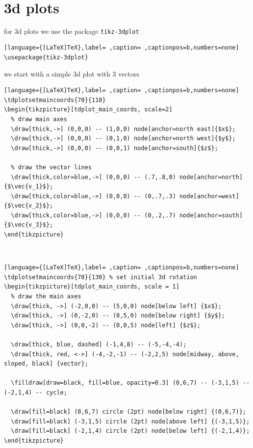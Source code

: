 \documentclass[a4paper,12pt]{article}
\begin{document}
\\[0pt]

\section{3d plots}
\label{sec:org336a9c7}
for 3d plots we use the package \texttt{tikz-3dplot}\\[0pt]
\begin{lstlisting}[language={[LaTeX]TeX},label= ,caption= ,captionpos=b,numbers=none]
\usepackage{tikz-3dplot}
\end{lstlisting}
we start with a simple 3d plot with 3 vectors\\[0pt]
\begin{lstlisting}[language={[LaTeX]TeX},label= ,caption= ,captionpos=b,numbers=none]
\tdplotsetmaincoords{70}{110}
\begin{tikzpicture}[tdplot_main_coords, scale=2]
  % draw main axes
  \draw[thick,->] (0,0,0) -- (1,0,0) node[anchor=north east]{$x$};
  \draw[thick,->] (0,0,0) -- (0,1,0) node[anchor=north west]{$y$};
  \draw[thick,->] (0,0,0) -- (0,0,1) node[anchor=south]{$z$};

  % draw the vector lines
  \draw[thick,color=blue,->] (0,0,0) -- (.7,.8,0) node[anchor=north]{$\vec{v_1}$};
  \draw[thick,color=blue,->] (0,0,0) -- (0,.7,.3) node[anchor=west]{$\vec{v_2}$};
  \draw[thick,color=blue,->] (0,0,0) -- (0,.2,.7) node[anchor=south]{$\vec{v_3}$};
\end{tikzpicture}
\end{lstlisting}

\\[0pt]

\begin{lstlisting}[language={[LaTeX]TeX},label= ,caption= ,captionpos=b,numbers=none]
\tdplotsetmaincoords{70}{130} % set initial 3d rotation
\begin{tikzpicture}[tdplot_main_coords, scale = 1]
  % draw the main axes
  \draw[thick, ->] (-2,0,0) -- (5,0,0) node[below left] {$x$};
  \draw[thick, ->] (0,-2,0) -- (0,5,0) node[below right] {$y$};
  \draw[thick, ->] (0,0,-2) -- (0,0,5) node[left] {$z$};

  \draw[thick, blue, dashed] (-1,4,8) -- (-5,-4,-4);
  \draw[thick, red, <->] (-4,-2,-1) -- (-2,2,5) node[midway, above, sloped, black] {vector};

  \filldraw[draw=black, fill=blue, opacity=0.3] (0,6,7) -- (-3,1,5) -- (-2,1,4) -- cycle;

  \draw[fill=black] (0,6,7) circle (2pt) node[below right] {(0,6,7)};
  \draw[fill=black] (-3,1,5) circle (2pt) node[above left] {(-3,1,5)};
  \draw[fill=black] (-2,1,4) circle (2pt) node[below left] {(-2,1,4)};
\end{tikzpicture}
\end{lstlisting}
\end{document}
